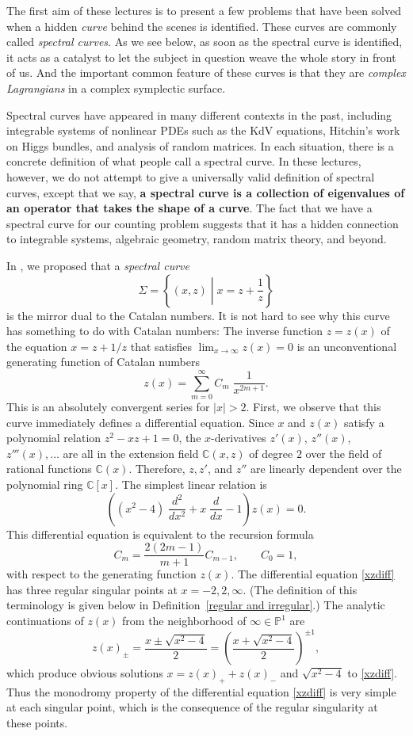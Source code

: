 \documentclass{amsart}
\theoremstyle{definition}
\numberwithin{equation}{section}
\numberwithin{figure}{section}
\newcommand{\be}{\begin{equation}}
\newcommand{\ee}{\end{equation}}
\newcommand{\bP}{{\mathbb{P}}}
\newcommand{\bC}{{\mathbb{C}}}
\newcommand{\rar}{\rightarrow}
\begin{document}
The first aim of these lectures is to present a few problems that have been 
solved when a hidden \emph{curve} behind the scenes is identified.
These curves are commonly called \emph{spectral curves}. 
As we see below, as soon as the spectral curve is identified,
it acts as a catalyst to let the subject in question weave the whole story
in front of us. And the important common feature of these curves
is that they are \emph{complex Lagrangians} in a complex symplectic
surface. 

Spectral curves have appeared in many different contexts in the past,
including integrable systems of nonlinear PDEs such as the KdV equations, 
Hitchin's work on Higgs bundles, and analysis of random matrices.
In each situation, there is a concrete definition of what people call a
spectral curve. In these lectures, however, we do not attempt to give a universally 
valid definition of spectral curves, except that we say,
\textbf{a spectral curve is a collection of eigenvalues of 
an operator that takes the shape of a curve}. The fact that we have a spectral
curve for our counting problem suggests that it has a
 hidden connection to integrable systems, algebraic geometry,  random
matrix theory, and beyond. 


In \cite{DMSS}, 
we  proposed  that a 
\emph{spectral curve}
\be
\label{xz}
\Sigma = \left\{ (x,z)\;\left|\;  x = z + \frac{1}{z}\right.\right\}
\ee
is the mirror dual to the Catalan numbers.
It is not hard to see why this curve 
has something to do with  Catalan numbers:
The inverse function $z=z(x)$ of the equation $x=z+1/z$  that satisfies 
$\lim_{x\rar \infty} z(x) = 0$ is an unconventional generating function of 
Catalan numbers
\be
\label{z(x)}
z(x) = \sum_{m=0}^\infty C_m \; \frac{1}{x^{2m+1}}.
\ee
This is an absolutely convergent series for $|x|>2$. First, we observe
that this curve immediately
defines a differential equation. 
Since $x$ and $z(x)$ satisfy a polynomial relation 
$z^2-xz + 1=0$, the $x$-derivatives $z'(x)$, $z''(x)$, $z'''(x),\dots$
are all in the extension field $\bC(x,z)$ of degree $2$
over the field  of rational functions $\bC(x)$.
Therefore, $z, z'$, and $z''$ are linearly dependent over 
the polynomial ring $\bC[x]$. The simplest linear relation is
\be
\label{xzdiff}
\left((x^2-4)\;\frac{d^2}{dx^2} + x\; \frac{d}{dx} -1
\right) z(x) = 0.
\ee
This differential equation  is equivalent to
the recursion formula
$$
C_m = \frac{2(2m-1)}{m+1} C_{m-1}, \qquad C_0 = 1,
$$
with respect to the generating function $z(x)$.
The differential equation \eqref{xzdiff} has three regular singular points
at $x = -2, 2, \infty$. (The definition of this terminology is given below in
Definition~\ref{regular and irregular}.)
The analytic continuations of $z(x)$  from the neighborhood 
of $\infty\in\bP^1$ are
$$
z(x)_\pm = \frac{x \pm \sqrt{x^2-4}}{2} = 
\left(\frac{x+\sqrt{x^2-4}}{2}\right)^{\pm 1},
$$
which produce obvious solutions  $x=z(x)_+ + z(x)_-$ 
and $\sqrt{x^2-4}$ to \eqref{xzdiff}.  Thus the monodromy property of 
the differential equation \eqref{xzdiff} is very simple at each singular point,
which is the consequence of the regular singularity at these points.
\end{document}
